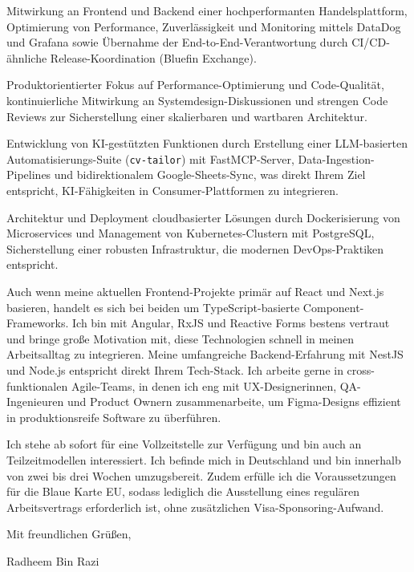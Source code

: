 \documentclass[11pt,a4paper]{coverletter}
\begin{document}
  \item Mitwirkung an Frontend und Backend einer hochperformanten Handelsplattform, Optimierung von Performance, Zuverlässigkeit und Monitoring mittels DataDog und Grafana sowie Übernahme der End-to-End-Verantwortung durch CI/CD-ähnliche Release-Koordination (Bluefin Exchange).

  \item Produktorientierter Fokus auf Performance-Optimierung und Code-Qualität, kontinuierliche Mitwirkung an Systemdesign-Diskussionen und strengen Code Reviews zur Sicherstellung einer skalierbaren und wartbaren Architektur.

  \item Entwicklung von KI-gestützten Funktionen durch Erstellung einer LLM-basierten Automatisierungs-Suite (\texttt{cv-tailor}) mit FastMCP-Server, Data-Ingestion-Pipelines und bidirektionalem Google-Sheets-Sync, was direkt Ihrem Ziel entspricht, KI-Fähigkeiten in Consumer-Plattformen zu integrieren.

  \item Architektur und Deployment cloudbasierter Lösungen durch Dockerisierung von Microservices und Management von Kubernetes-Clustern mit PostgreSQL, Sicherstellung einer robusten Infrastruktur, die modernen DevOps-Praktiken entspricht.

\bulletsend

Auch wenn meine aktuellen Frontend-Projekte primär auf React und Next.js basieren, handelt es sich bei beiden um TypeScript-basierte Component-Frameworks. Ich bin mit Angular, RxJS und Reactive Forms bestens vertraut und bringe große Motivation mit, diese Technologien schnell in meinen Arbeitsalltag zu integrieren. Meine umfangreiche Backend-Erfahrung mit NestJS und Node.js entspricht direkt Ihrem Tech-Stack. Ich arbeite gerne in cross-funktionalen Agile-Teams, in denen ich eng mit UX-Designerinnen, QA-Ingenieuren und Product Ownern zusammenarbeite, um Figma-Designs effizient in produktionsreife Software zu überführen.

Ich stehe ab sofort für eine Vollzeitstelle zur Verfügung und bin auch an Teilzeitmodellen interessiert. Ich befinde mich in Deutschland und bin innerhalb von zwei bis drei Wochen umzugsbereit. Zudem erfülle ich die Voraussetzungen für die Blaue Karte EU, sodass lediglich die Ausstellung eines regulären Arbeitsvertrags erforderlich ist, ohne zusätzlichen Visa-Sponsoring-Aufwand.

\closing{Mit freundlichen Grüßen,}{Radheem Bin Razi}
\end{document}
